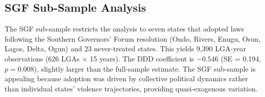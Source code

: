 \documentclass[12pt]{article}
\begin{document}
\subsection{SGF Sub-Sample Analysis}

The SGF sub-sample restricts the analysis to seven states that adopted laws following the Southern Governors' Forum resolution (Ondo, Rivers, Enugu, Osun, Lagos, Delta, Ogun) and 23 never-treated states. This yields 9,390 LGA-year observations (626 LGAs $\times$ 15 years). The DDD coefficient is $-0.546$ (SE = 0.194, $p = 0.008$), slightly larger than the full-sample estimate. The SGF sub-sample is appealing because adoption was driven by collective political dynamics rather than individual states' violence trajectories, providing quasi-exogenous variation.
\end{document}
